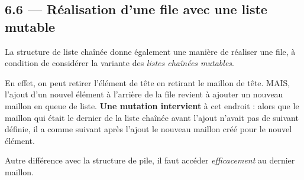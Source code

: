 \documentclass[a4paper,17pt]{extarticle}
\begin{document}
    \hypertarget{ruxe9alisation-dune-file-avec-une-liste-mutable}{%
\subsection{6.6 --- Réalisation d'une file avec une liste
mutable}\label{ruxe9alisation-dune-file-avec-une-liste-mutable}}

    La structure de liste chaînée donne également une manière de réaliser
une file, à condition de considérer la variante des \emph{listes
chaînées mutables}.

En effet, on peut retirer l'élément de tête en retirant le maillon de
tête. MAIS, l'ajout d'un nouvel élément à l'arrière de la file revient à
ajouter un nouveau maillon en queue de liste. \textbf{Une mutation
intervient} à cet endroit : alors que le maillon qui était le dernier de
la liste chaînée avant l'ajout n'avait pas de suivant définie, il a
comme suivant après l'ajout le nouveau maillon créé pour le nouvel
élément.

    Autre différence avec la structure de pile, il faut accéder
\emph{efficacement} au dernier maillon.
\end{document}
